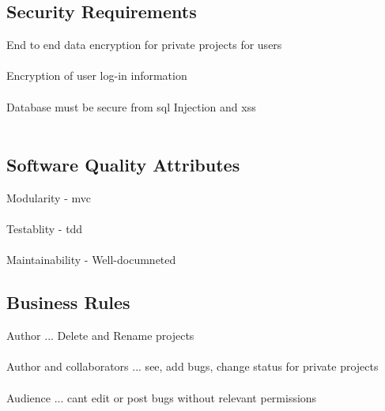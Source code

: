 \documentclass{article}
\newcommand{\comment}[1]{}
\begin{document}
\subsection{Security Requirements}
\comment{
Specify any requirements regarding security or privacy issues surrounding use of the product or protection of the data used or created by the product. Define any user identity authentication requirements. Refer to any external policies or regulations containing security issues that affect the product. Define any security or privacy certifications that must be satisfied.
	}
End to end data encryption for private projects for users 
\\ \\ 
Encryption of user log-in information
\\ \\ 
Database must be secure from \acrshort{sql} Injection and \acrshort{xss} 
\\ \\
\subsection{Software Quality Attributes}
\comment{
Specify any additional quality characteristics for the product that will be omportant to either the customer or the developer. Some to consider are adaptability, availability, correctness, flexibility, interoperability, maintaintability, portability, reliability, reusability, robustness, testability, and usability. Write these to be specific, quantative and verifiable where possible. At least, clarify the relative preferences for various attributes, such as ease of use over ease of learning.dd
	}
Modularity - \acrshort{mvc}
\\ \\ 
Testablity - \acrshort{tdd}
\\ \\ 
Maintainability - Well-documneted
\subsection{Business Rules}
\comment{
List any principles about the product, such as which individuals or roles can perform which functions under specific circumstances. These are not functional requirments in themselves, but they may imply certain functional to enforce the rules.
	}
Author ... Delete and Rename projects
\\ \\ 
Author and collaborators ...  see, add bugs, change status for private projects
\\ \\ 
Audience ... cant edit or post bugs without relevant permissions 
\\ \\ 
\newpage
\end{document}
